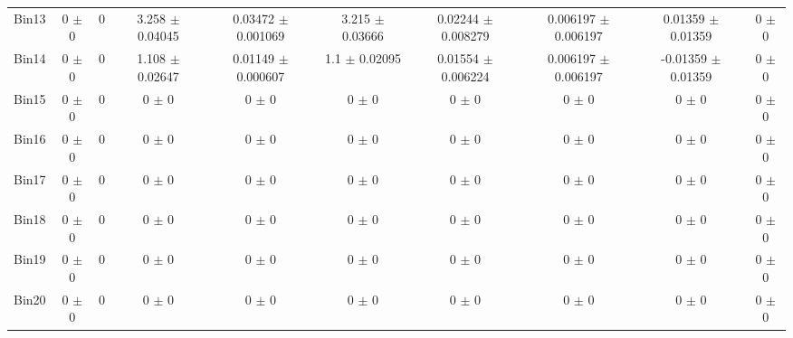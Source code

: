 \begin{tabular}{@{\extracolsep{4pt}}lccccccccc@{}}
     Bin13 & 0 $\pm$ 0 & 0 & 3.258 $\pm$ 0.04045 & 0.03472 $\pm$ 0.001069 & 3.215 $\pm$ 0.03666 & 0.02244 $\pm$ 0.008279 & 0.006197 $\pm$ 0.006197 & 0.01359 $\pm$ 0.01359 & 0 $\pm$ 0 \\ 
     Bin14 & 0 $\pm$ 0 & 0 & 1.108 $\pm$ 0.02647 & 0.01149 $\pm$ 0.000607 & 1.1 $\pm$ 0.02095 & 0.01554 $\pm$ 0.006224 & 0.006197 $\pm$ 0.006197 & -0.01359 $\pm$ 0.01359 & 0 $\pm$ 0 \\ 
     Bin15 & 0 $\pm$ 0 & 0 & 0 $\pm$ 0 & 0 $\pm$ 0 & 0 $\pm$ 0 & 0 $\pm$ 0 & 0 $\pm$ 0 & 0 $\pm$ 0 & 0 $\pm$ 0 \\ 
     Bin16 & 0 $\pm$ 0 & 0 & 0 $\pm$ 0 & 0 $\pm$ 0 & 0 $\pm$ 0 & 0 $\pm$ 0 & 0 $\pm$ 0 & 0 $\pm$ 0 & 0 $\pm$ 0 \\ 
     Bin17 & 0 $\pm$ 0 & 0 & 0 $\pm$ 0 & 0 $\pm$ 0 & 0 $\pm$ 0 & 0 $\pm$ 0 & 0 $\pm$ 0 & 0 $\pm$ 0 & 0 $\pm$ 0 \\ 
     Bin18 & 0 $\pm$ 0 & 0 & 0 $\pm$ 0 & 0 $\pm$ 0 & 0 $\pm$ 0 & 0 $\pm$ 0 & 0 $\pm$ 0 & 0 $\pm$ 0 & 0 $\pm$ 0 \\ 
     Bin19 & 0 $\pm$ 0 & 0 & 0 $\pm$ 0 & 0 $\pm$ 0 & 0 $\pm$ 0 & 0 $\pm$ 0 & 0 $\pm$ 0 & 0 $\pm$ 0 & 0 $\pm$ 0 \\ 
     Bin20 & 0 $\pm$ 0 & 0 & 0 $\pm$ 0 & 0 $\pm$ 0 & 0 $\pm$ 0 & 0 $\pm$ 0 & 0 $\pm$ 0 & 0 $\pm$ 0 & 0 $\pm$ 0 \\ 
\hline\hline
  \end{tabular}
